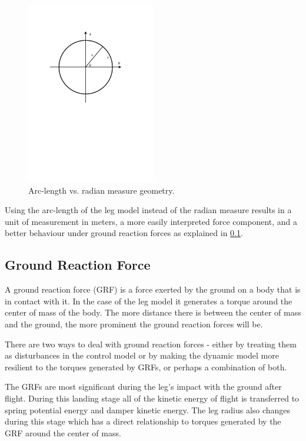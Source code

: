 \begin{figure}
\centering
\includegraphics[clip, trim=2cm 8cm 2cm 2cm, page=1, width=0.5\textwidth]{images/control/arc-length-theta-geometry.pdf} 
\caption{Arc-length vs. radian measure geometry.}
\label{fig:Arc-length vs. radian measure geometry}
\end{figure}

Using the arc-length of the leg model instead of the radian measure results in a unit of measurement in meters, a more easily interpreted force component, and a better behaviour under ground reaction forces as explained in \cref{sec:Ground Reaction Force}. 

\subsection{Ground Reaction Force}
\label{sec:Ground Reaction Force}

A ground reaction force (GRF) is a force exerted by the ground on a body that is in contact with it. In the case of the leg model it generates a torque around the center of mass of the body. The more distance there is between the center of mass and the ground, the more prominent the ground reaction forces will be. 

There are two ways to deal with ground reaction forces - either by treating them as disturbances in the control model or by making the dynamic model more resilient to the torques generated by GRFs, or perhaps a combination of both. 

The GRFs are most significant during the leg's impact with the ground after flight. During this landing stage all of the kinetic energy of flight is transferred to spring potential energy and damper kinetic energy. The leg radius also changes during this stage which has a direct relationship to torques generated by the GRF around the center of mass. 

